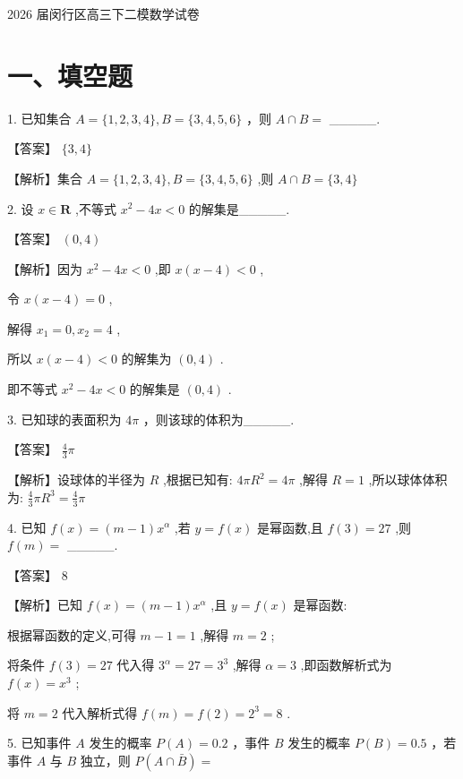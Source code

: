 \documentclass[10pt]{article}
\begin{document}
2026 届闵行区高三下二模数学试卷

\section*{一、填空题}

1. 已知集合 \(A = \{ 1,2,3,4\} ,B = \{ 3,4,5,6\}\) ，则 \(A \cap  B =\) \_\_\_\_\_.

【答案】 \(\{ 3,4\}\)

【解析】集合 \(A = \{ 1,2,3,4\} ,B = \{ 3,4,5,6\}\) ,则 \(A \cap  B = \{ 3,4\}\)

2. 设 \(x \in  \mathbf{R}\) ,不等式 \({x}^{2} - {4x} < 0\) 的解集是\_\_\_\_\_.

【答案】 \(\left( {0,4}\right)\)

【解析】因为 \({x}^{2} - {4x} < 0\) ,即 \(x\left( {x - 4}\right)  < 0\) ,

令 \(x\left( {x - 4}\right)  = 0\) ,

解得 \({x}_{1} = 0,{x}_{2} = 4\) ,

所以 \(x\left( {x - 4}\right)  < 0\) 的解集为 \(\left( {0,4}\right)\) .

即不等式 \({x}^{2} - {4x} < 0\) 的解集是 \(\left( {0,4}\right)\) .

3. 已知球的表面积为 \({4\pi }\) ，则该球的体积为\_\_\_\_\_.

【答案】 \(\frac{4}{3}\pi\)

【解析】设球体的半径为 \(R\) ,根据已知有: \({4\pi }{R}^{2} = {4\pi }\) ,解得 \(R = 1\) ,所以球体体积为: \(\frac{4}{3}\pi {R}^{3} = \frac{4}{3}\pi\)

4. 已知 \(f\left( x\right)  = \left( {m - 1}\right) {x}^{\alpha }\) ,若 \(y = f\left( x\right)\) 是幂函数,且 \(f\left( 3\right)  = {27}\) ,则 \(f\left( m\right)  =\) \_\_\_\_\_.

【答案】 8

【解析】已知 \(f\left( x\right)  = \left( {m - 1}\right) {x}^{\alpha }\) ,且 \(y = f\left( x\right)\) 是幂函数:

根据幂函数的定义,可得 \(m - 1 = 1\) ,解得 \(m = 2\) ;

将条件 \(f\left( 3\right)  = {27}\) 代入得 \({3}^{\alpha } = {27} = {3}^{3}\) ,解得 \(\alpha  = 3\) ,即函数解析式为 \(f\left( x\right)  = {x}^{3}\) ;

将 \(m = 2\) 代入解析式得 \(f\left( m\right)  = f\left( 2\right)  = {2}^{3} = 8\) .

5. 已知事件 \(A\) 发生的概率 \(P\left( A\right)  = {0.2}\) ，事件 \(B\) 发生的概率 \(P\left( B\right)  = {0.5}\) ，若事件 \(A\) 与 \(B\) 独立，则 \(P\left( {A \cap  \bar{B}}\right)  =\)
\end{document}
